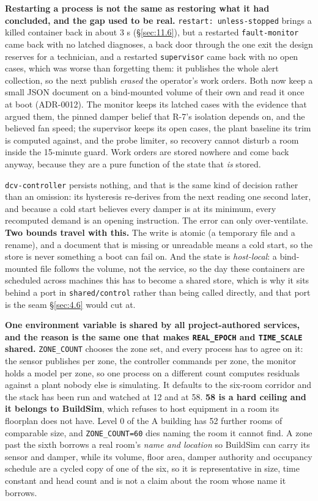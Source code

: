 \textbf{Restarting a process is not the same as restoring what it had concluded, and the gap used
to be real.} \texttt{restart: unless-stopped} brings a killed container back in about 3 s (§\ref{sec:11.6}),
but a restarted \texttt{fault-monitor} came back with no latched diagnoses, a back door through
the one exit the design reserves for a technician, and a restarted \texttt{supervisor} came back
with no open cases, which was worse than forgetting them: it publishes the whole alert collection,
so the next publish \emph{erased} the operator's work orders. Both now keep a small JSON document
on a bind-mounted volume of their own and read it once at boot (ADR-0012). The monitor keeps its
latched cases with the evidence that argued them, the pinned damper belief that R-7's isolation
depends on, and the believed fan speed; the supervisor keeps its open cases, the plant baseline its
trim is computed against, and the probe limiter, so recovery cannot disturb a room inside the 15-minute
guard. Work orders are stored nowhere and come back anyway, because they are a pure function of the
state that \emph{is} stored.

\texttt{dcv-controller} persists nothing, and that is the same kind of decision rather than an
omission: its hysteresis re-derives from the next reading one second later, and because a cold start
believes every damper is at its minimum, every recomputed demand is an opening instruction. The
error can only over-ventilate. \textbf{Two bounds travel with this.} The write is atomic (a
temporary file and a rename), and a document that is missing or unreadable means a cold start, so
the store is never something a boot can fail on. And the state is \emph{host-local}: a bind-mounted
file follows the volume, not the service, so the day these containers are scheduled across machines
this has to become a shared store, which is why it sits behind a port in \texttt{shared/control}
rather than being called directly, and that port is the seam §\ref{sec:4.6} would cut at.

\textbf{One environment variable is shared by all \factAuthoredServices{} project-authored services, and the reason
is the same one that makes \texttt{REAL\_EPOCH} and \texttt{TIME\_SCALE} shared.} \texttt{ZONE\_COUNT}
chooses the zone set, and every process has to agree on it: the sensor publishes per zone, the
controller commands per zone, the monitor holds a model per zone, so one process on a different count
computes residuals against a plant nobody else is simulating. It defaults to the six-room corridor and
the stack has been run and watched at 12 and at 58. \textbf{58 is a hard ceiling and it belongs to
BuildSim}, which refuses to host equipment in a room its floorplan does not have. Level 0 of the A
building has 52 further rooms of comparable size, and \texttt{ZONE\_COUNT=60} dies naming the room it
cannot find. A zone past the sixth borrows a real room's \emph{name and location} so BuildSim can
carry its sensor and damper, while its volume, floor area, damper authority and occupancy schedule
are a cycled copy of one of the six, so it is representative in size, time constant and head count
and is not a claim about the room whose name it borrows.

